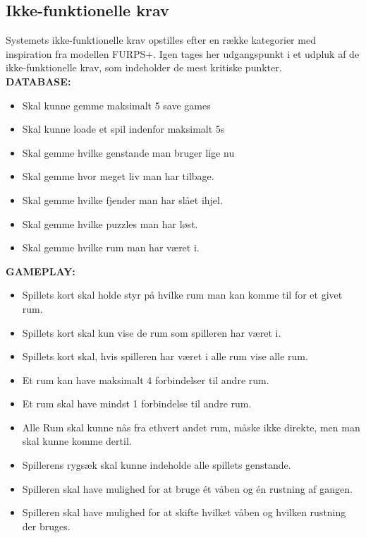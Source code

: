 \subsection{Ikke-funktionelle krav}
Systemets ikke-funktionelle krav opstilles efter en række kategorier med inspiration fra modellen FURPS+. Igen tages her udgangspunkt i et udpluk af de ikke-funktionelle krav, som indeholder de mest kritiske punkter.\\

\textbf{DATABASE:}

\begin{itemize}
  \item Skal kunne gemme maksimalt 5 save games
  \item Skal kunne loade et spil indenfor maksimalt 5s
  \item Skal gemme hvilke genstande man bruger lige nu
  \item Skal gemme hvor meget liv man har tilbage.
  \item Skal gemme hvilke fjender man har slået ihjel.
  \item Skal gemme hvilke puzzles man har løst.
  \item Skal gemme hvilke rum man har været i.
\end{itemize}

\textbf{GAMEPLAY:}
\begin{itemize}
  \item Spillets kort skal holde styr på hvilke rum man kan komme til for et givet rum.
  \item Spillets kort skal kun vise de rum som spilleren har været i.
  \item Spillets kort skal, hvis spilleren har været i alle rum vise alle rum.
  \item Et rum kan have maksimalt 4 forbindelser til andre rum.
  \item Et rum skal have mindst 1 forbindelse til andre rum.
  \item Alle Rum skal kunne nås fra ethvert andet rum, måske ikke direkte, men man skal kunne komme dertil.
  \item Spillerens rygsæk skal kunne indeholde alle spillets genstande.
  \item Spilleren skal have mulighed for at bruge ét våben og én rustning af gangen.
  \item Spilleren skal have mulighed for at skifte hvilket våben og hvilken rustning der bruges.
\end{itemize}
    
